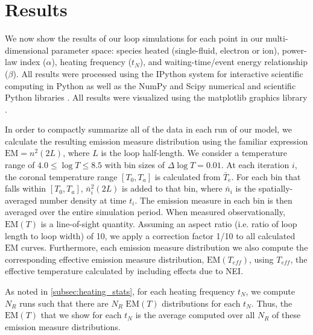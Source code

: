 \documentclass[apj]{emulateapj}
\begin{document}
	\section{Results}
	\label{sec:results}
	\par We now show the results of our loop simulations for each point in our multi-dimensional parameter space: species heated (single-fluid, electron or ion), power-law index ($\alpha$), heating frequency ($t_N$), and waiting-time/event energy relationship ($\beta$). All results were processed using the IPython system for interactive scientific computing in Python \citep{perez_ipython:_2007} as well as the NumPy and Scipy numerical and scientific Python libraries \citep{van_der_walt_numpy_2011}. All results were visualized using the matplotlib graphics library \citep{hunter_matplotlib:_2007}.
	\par In order to compactly summarize all of the data in each run of our model, we calculate the resulting emission measure distribution using the familiar expression $\mathrm{EM}=n^2(2L)$, where $L$ is the loop half-length. We consider a temperature range of $4.0\le\log{T}\le8.5$ with bin sizes of $\Delta\log{T}=0.01$. At each iteration $i$, the coronal temperature range $[T_0,T_a]$ is calculated from $\bar{T}_e$. For each bin that falls within $[T_0,T_a]$, $\bar{n}_i^2(2L)$ is added to that bin, where $\bar{n}_i$ is the spatially-averaged number density at time $t_i$. The emission measure in each bin is then averaged over the entire simulation period. When measured observationally, $\mathrm{EM}(T)$ is a line-of-sight quantity. Assuming an aspect ratio (i.e. ratio of loop length to loop width) of 10, we apply a correction factor 1/10 to all calculated $\mathrm{EM}$ curves. Furthermore, each emission measure distribution we also compute the corresponding effective emission measure distribution, $\mathrm{EM}(T_{eff})$, using $T_{eff}$, the effective temperature calculated by including effects due to NEI.
	\par As noted in \autoref{subsec:heating_stats}, for each heating frequency $t_N$, we compute $N_R$ runs such that there are $N_R$ $\mathrm{EM}(T)$ distributions for each $t_N$. Thus, the $\mathrm{EM}(T)$ that we show for each $t_N$ is the average computed over all $N_R$ of these emission measure distributions. 
\end{document}
